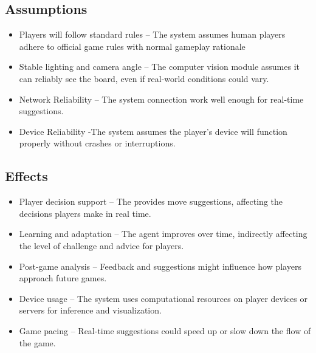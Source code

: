 \documentclass{article}
\begin{document}
\subsection{Assumptions}\label{subsec:assumptions}
\begin{itemize}
    \item {Players will follow standard \emph{\Catan{}} rules} – The system assumes human players adhere to official game rules with normal gameplay rationale
    \item {Stable lighting and camera angle} – The computer vision module assumes it can reliably see the board, even if real-world conditions could vary.
    \item {Network Reliability} – The system connection work well enough for real-time suggestions.
    \item {Device Reliability} -The system assumes the player’s device will function properly without crashes or interruptions.
\end{itemize}

\subsection{Effects}\label{subsec:effects}
\begin{itemize}
    \item {Player decision support} – The \AI{} provides move suggestions, affecting the decisions players make in real time.
    \item {Learning and adaptation} – The \RL{} agent improves over time, indirectly affecting the level of challenge and advice for players.
    \item {Post-game analysis} – Feedback and suggestions might influence how players approach future games.
    \item {Device usage} – The system uses computational resources on player devices or servers for inference and visualization.
    \item {Game pacing} – Real-time suggestions could speed up or slow down the flow of the game.
\end{itemize}
\end{document}
